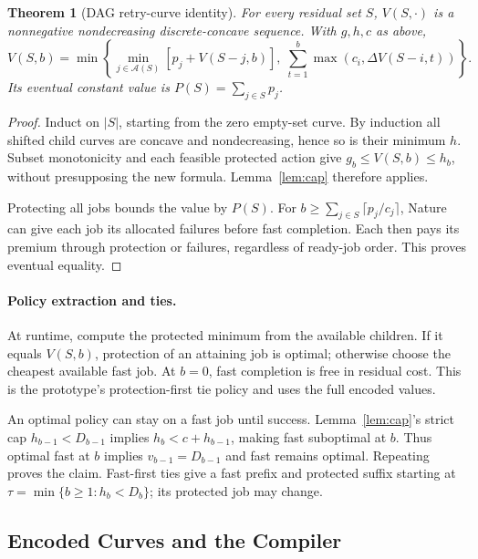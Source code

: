\documentclass[acmsmall,screen,review,anonymous]{acmart}
\newtheorem{theorem}{Theorem}
\begin{document}
\begin{theorem}[DAG retry-curve identity]
\label{thm:dagcurves}
For every residual set $S$, $V(S,\cdot)$ is a nonnegative nondecreasing discrete-concave sequence. With $g,h,c$ as above,
\begin{equation}
 V(S,b)=\min\left\{
 \min_{j\in\mathcal A(S)}[p_j+V(S-j,b)],\;
 \sum_{t=1}^{b}\max(c_i,\Delta V(S-i,t))\right\}.
 \label{eq:dagcurve}
\end{equation}
Its eventual constant value is $P(S)=\sum_{j\in S}p_j$.
\end{theorem}
\begin{proof}
Induct on $|S|$, starting from the zero empty-set curve. By induction all shifted child curves are concave and nondecreasing, hence so is their minimum $h$. Subset monotonicity and each feasible protected action give $g_b\le V(S,b)\le h_b$, without presupposing the new formula. Lemma~\ref{lem:cap} therefore applies.

Protecting all jobs bounds the value by $P(S)$. For $b\ge\sum_{j\in S}\lceil p_j/c_j\rceil$, Nature can give each job its allocated failures before fast completion. Each then pays its premium through protection or failures, regardless of ready-job order. This proves eventual equality.
\end{proof}

\paragraph{Policy extraction and ties.}
At runtime, compute the protected minimum from the available children. If it equals $V(S,b)$, protection of an attaining job is optimal; otherwise choose the cheapest available fast job. At $b=0$, fast completion is free in residual cost. This is the prototype's protection-first tie policy and uses the full encoded values.

An optimal policy can stay on a fast job until success. Lemma~\ref{lem:cap}'s strict cap $h_{b-1}<D_{b-1}$ implies $h_b<c+h_{b-1}$, making fast suboptimal at $b$. Thus optimal fast at $b$ implies $v_{b-1}=D_{b-1}$ and fast remains optimal. Repeating proves the claim. Fast-first ties give a fast prefix and protected suffix starting at $\tau=\min\{b\ge1:h_b<D_b\}$; its protected job may change.



\subsection{Encoded Curves and the Compiler}
\end{document}
